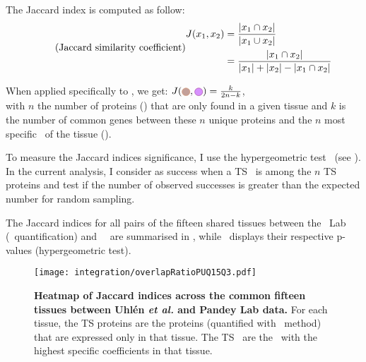 \begin{minipage}{\textwidth}
    The Jaccard index is computed as follow:
\begin{equation}
    \tag{Jaccard similarity coefficient}\label{eq:Jaccard}
    \begin{split}
        J(x_{1},x_{2}) & = \frac{\left | x_{1}\cap  x_{2}\right |}%
                                {\left | x_{1}\cup  x_{2}\right |}\\
                       & = \frac{\left | x_{1}\cap  x_{2}\right |}%
                                {\left | x_{1} \right | + \left | x_{2} \right |%
                                - \left | x_{1}\cap  x_{2}\right |}\\
    \end{split}
    \raisetag{6cm}
\end{equation}

When applied specifically to , we get:
$J(\tikzcircle[Tan,fill={rgb,255:red,195; green,160;blue,153}]{4pt},%
\tikzcircle[DarkOrchid,fill={rgb,255:red,215; green,145; blue,254}]{4pt}) = \frac{k}{2n-k}$,\\
with $n$ the number of proteins (\tikzcircle[Tan,fill={rgb,255:red,195; green,160;blue,153}]{4pt})
that are only found in a given tissue and
$k$ is the number of common genes between
these $n$ unique proteins
and the $n$ most specific \mRNAs\ of the tissue
(\tikzcircle[DarkOrchid,fill={rgb,255:red,215; green,145; blue,254}]{4pt}).
\end{minipage}

\vspace{3mm}
To measure the Jaccard indices significance,
I use the hypergeometric test~
(see ).
In the current analysis,
I consider as success when a \gls{TS} \mRNA\ is among the $n$ \gls{TS} proteins
and test if the number of observed successes is greater than
the expected number for random sampling.\mybr\

\vspace{3mm}
The Jaccard indices for all pairs of the fifteen shared tissues
between the \pandey\ Lab (\PPKM\ quantification) and \uhlen\ \etal\
are summarised in ,
while~ displays
their respective p-values (hypergeometric test).\mybr\

\begin{figure}[!ht]
    \texttt{[image: integration/overlapRatioPUQ15Q3.pdf]}\centering
    \caption[Heatmap of Jaccard indices across 15 tissues]{%
\label{fig:JaccardIndexes}\label{fig:RatioJac}\textbf{Heatmap of Jaccard indices
across the common fifteen tissues between Uhlén \textit{et al.} and Pandey Lab data.}
For each tissue, the \gls{TS} proteins are the proteins
(quantified with \PPKM\ method) that are expressed only in that tissue.
The \gls{TS} \mRNAs\ are the \mRNAs\ with the highest specific coefficients
in that tissue.}
\end{figure}

